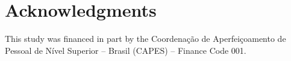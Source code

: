 \section*{Acknowledgments}
This study was financed in part by the Coordenação de Aperfeiçoamento de Pessoal de Nível Superior – Brasil (CAPES) – Finance Code 001.